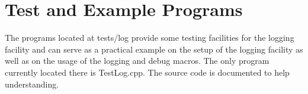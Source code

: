 \section{Test and Example Programs}

The programs located at tests/log provide some testing facilities
for the logging facility and can serve as a practical example on the
setup of the logging facility as well as on the usage of
the logging and debug macros. The only program currently located there
is TestLog.cpp. The source code is documented to help understanding.

